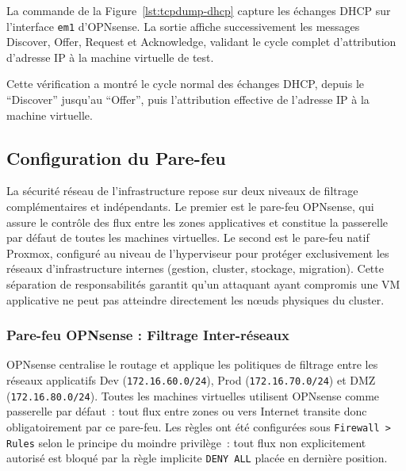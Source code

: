 \par La commande de la Figure~\ref{lst:tcpdump-dhcp} capture les échanges DHCP sur l'interface \texttt{em1} d'OPNsense. La sortie affiche successivement les messages Discover, Offer, Request et Acknowledge, validant le cycle complet d'attribution d'adresse IP à la machine virtuelle de test.\\

\par Cette vérification a montré le cycle normal des échanges DHCP, depuis le ``Discover'' jusqu'au ``Offer'', puis l'attribution effective de l'adresse IP à la machine virtuelle.\\


\subsection{Configuration du Pare-feu}

\par La sécurité réseau de l'infrastructure repose sur deux niveaux de
filtrage complémentaires et indépendants. Le premier est le pare-feu
OPNsense, qui assure le contrôle des flux entre les zones applicatives et
constitue la passerelle par défaut de toutes les machines virtuelles. Le
second est le pare-feu natif Proxmox, configuré au niveau de l'hyperviseur
pour protéger exclusivement les réseaux d'infrastructure internes (gestion,
cluster, stockage, migration). Cette séparation de responsabilités garantit
qu'un attaquant ayant compromis une VM applicative ne peut pas atteindre
directement les nœuds physiques du cluster.

\subsubsection{Pare-feu OPNsense : Filtrage Inter-réseaux}

\par OPNsense centralise le routage et applique les politiques de filtrage
entre les réseaux applicatifs Dev (\texttt{172.16.60.0/24}), Prod
(\texttt{172.16.70.0/24}) et DMZ (\texttt{172.16.80.0/24}). Toutes les
machines virtuelles utilisent OPNsense comme passerelle par défaut~: tout
flux entre zones ou vers Internet transite donc obligatoirement par ce
pare-feu. Les règles ont été configurées sous \texttt{Firewall\,>\,Rules}
selon le principe du moindre privilège~: tout flux non explicitement
autorisé est bloqué par la règle implicite \texttt{DENY ALL} placée en
dernière position.\\

